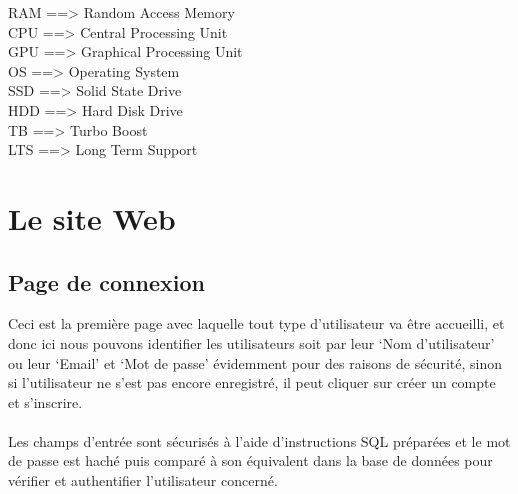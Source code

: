 \documentclass[12pt]{report}
\begin{document}
RAM \hspace{0.245in} ==> \hspace{0.22in} Random Access Memory
\\
CPU \hspace{0.3in} ==> \hspace{0.22in} Central Processing Unit
\\
GPU \hspace{0.3in} ==> \hspace{0.22in} Graphical Processing Unit
\\
OS  \hspace{0.42in} ==> \hspace{0.22in} Operating System
\\
SSD \hspace{0.33in} ==> \hspace{0.22in} Solid State Drive
\\
HDD \hspace{0.28in} ==> \hspace{0.22in} Hard Disk Drive
\\
TB  \hspace{0.43in} ==> \hspace{0.22in} Turbo Boost 
\\
LTS \hspace{0.365in} ==> \hspace{0.22in} Long Term Support

\newpage

\section{Le site Web}

\subsection{Page de connexion}

\vspace{0.2in}

Ceci est la première page avec laquelle tout type d'utilisateur va être accueilli, et donc ici nous pouvons identifier les utilisateurs soit par leur `Nom d'utilisateur' ou leur `Email' et `Mot de passe' évidemment pour des raisons de sécurité, sinon si l'utilisateur ne s'est pas encore enregistré, il peut cliquer sur créer un compte et s'inscrire.
\\\\
Les champs d'entrée sont sécurisés à l'aide d'instructions SQL préparées et le mot de passe est haché puis comparé à son équivalent dans la base de données pour vérifier et authentifier l'utilisateur concerné.
\end{document}

